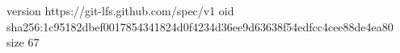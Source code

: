 version https://git-lfs.github.com/spec/v1
oid sha256:1c95182dbef0017854341824d0f4234d36ee9d63638f54edfcc4cee88de4ea80
size 67
